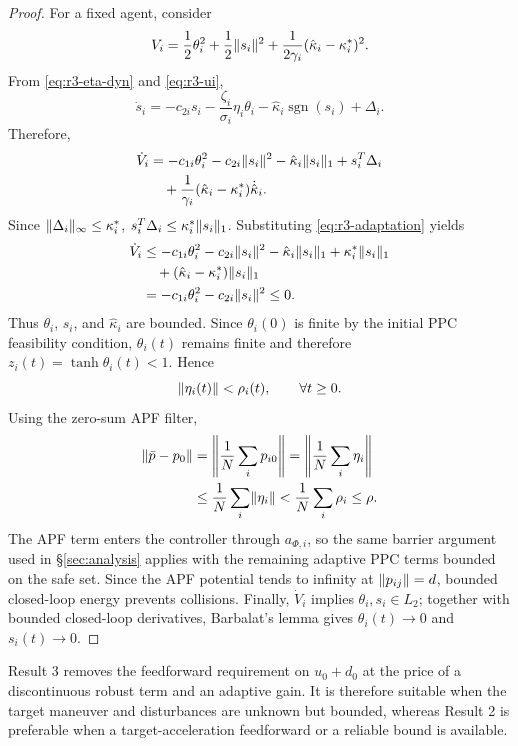 \begin{proof}
For a fixed agent, consider
\[
V_i
=\frac12\theta_i^2+\frac12\lVert s_i \rVert^2
 +\frac{1}{2\gamma_i}(\hat\kappa_i-\kappa_i^*)^2.
\]
From \eqref{eq:r3-eta-dyn} and \eqref{eq:r3-ui},
\[
\dot s_i
=-c_{2i}s_i-\frac{\zeta_i}{\sigma_i}\eta_i\theta_i
-\hat\kappa_i\operatorname{sgn}(s_i)+\Delta_i.
\]
Therefore,
\[
\begin{aligned}
\dot V_i
&=-c_{1i}\theta_i^2-c_{2i}\lVert s_i \rVert^2
  -\hat\kappa_i\lVert s_i \rVert_1+s_i^T\Delta_i\\
&\quad
  +\frac{1}{\gamma_i}(\hat\kappa_i-\kappa_i^*)\dot{\hat\kappa}_i .
\end{aligned}
\]
Since $\lVert \Delta_i \rVert_\infty\le\kappa_i^*$,
$s_i^T\Delta_i\le\kappa_i^*\lVert s_i \rVert_1$.  Substituting
\eqref{eq:r3-adaptation} yields
\[
\begin{aligned}
\dot V_i
&\le -c_{1i}\theta_i^2-c_{2i}\lVert s_i \rVert^2
    -\hat\kappa_i\lVert s_i \rVert_1+\kappa_i^*\lVert s_i \rVert_1\\
&\quad
    +(\hat\kappa_i-\kappa_i^*)\lVert s_i \rVert_1\\
&= -c_{1i}\theta_i^2-c_{2i}\lVert s_i \rVert^2\le0 .
\end{aligned}
\]
Thus $\theta_i$, $s_i$, and $\hat\kappa_i$ are bounded.  Since
$\theta_i(0)$ is finite by the initial PPC feasibility condition,
$\theta_i(t)$ remains finite and therefore
$z_i(t)=\tanh\theta_i(t)<1$.  Hence
\[
\lVert \eta_i(t) \rVert<\rho_i(t),\qquad \forall t\ge0.
\]
Using the zero-sum APF filter,
\[
\begin{aligned}
\lVert \bar p-p_0 \rVert
&=\left\|\frac1N\sum_i p_{i0}\right\|
 =\left\|\frac1N\sum_i \eta_i\right\|\\
&\le \frac1N\sum_i\lVert \eta_i \rVert
 < \frac1N\sum_i\rho_i
\le \rho .
\end{aligned}
\]
The APF term enters the controller through $a_{\Phi,i}$, so the same
barrier argument used in \S\ref{sec:analysis} applies with the remaining
adaptive PPC terms bounded on the safe set.  Since the APF potential tends
to infinity at $\lVert p_{ij} \rVert=d$, bounded closed-loop energy prevents
collisions.  Finally, $\dot V_i$ implies $\theta_i,s_i\in L_2$; together
with bounded closed-loop derivatives, Barbalat's lemma gives
$\theta_i(t)\to0$ and $s_i(t)\to0$.
\end{proof}

\begin{remark}
Result 3 removes the feedforward requirement on $u_0+d_0$ at the price of a
discontinuous robust term and an adaptive gain.  It is therefore suitable
when the target maneuver and disturbances are unknown but bounded, whereas
Result 2 is preferable when a target-acceleration feedforward or a reliable
bound is available.
\end{remark}
